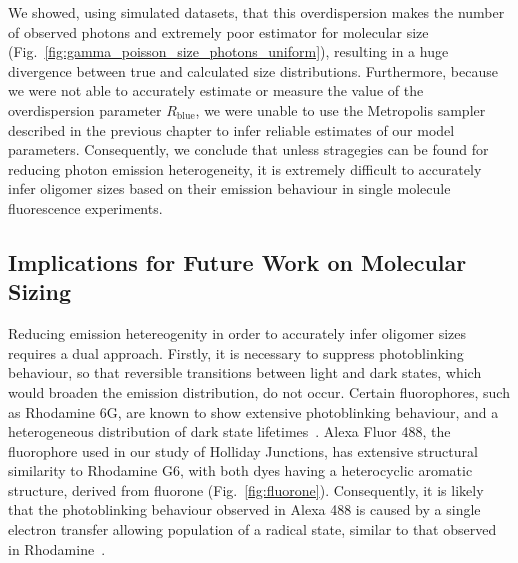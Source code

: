 We showed, using simulated datasets, that this overdispersion makes the number of observed photons and extremely poor estimator for molecular size (Fig.~\ref{fig:gamma_poisson_size_photons_uniform}), resulting in a huge divergence between true and calculated size distributions. Furthermore, because we were not able to accurately estimate or measure the value of the overdispersion parameter $R_{\text{blue}}$, we were unable to use the Metropolis sampler described in the previous chapter to infer reliable estimates of our model parameters. Consequently, we conclude that unless stragegies can be found for reducing photon emission heterogeneity, it is extremely difficult to accurately infer oligomer sizes based on their emission behaviour in single molecule fluorescence experiments.

\subsection{Implications for Future Work on Molecular Sizing}
Reducing emission hetereogenity in order to accurately infer oligomer sizes requires a dual approach. Firstly, it is necessary to suppress photoblinking behaviour, so that reversible transitions between light and dark states, which would broaden the emission distribution, do not occur. Certain fluorophores, such as Rhodamine 6G, are known to show extensive photoblinking behaviour, and a heterogeneous distribution of dark state lifetimes~\cite{zondervan03}. Alexa Fluor 488, the fluorophore used in our study of Holliday Junctions, has extensive structural similarity to Rhodamine G6, with both dyes having a heterocyclic aromatic structure, derived from fluorone (Fig.~\ref{fig:fluorone}). Consequently, it is likely that the photoblinking behaviour observed in Alexa 488 is caused by a single electron transfer allowing population of a radical state, similar to that observed in Rhodamine~\cite{zondervan03}. 


